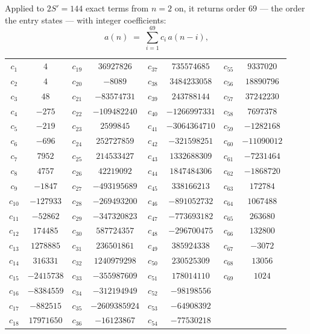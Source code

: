 \documentclass[11pt,a4paper]{article}
\theoremstyle{plain}
\theoremstyle{definition}
\begin{document}
Applied to $2S'=144$ exact terms from $n=2$ on, it returns order $69$ --- the
order the entry states --- with integer coefficients:
\[
a(n)\;=\;\sum_{i=1}^{69}c_i\,a(n-i),
\]
\begin{center}\small
\begin{tabular}{cccccccc}
$c_{1}$ & $4$ & $c_{19}$ & $36927826$ & $c_{37}$ & $735574685$ & $c_{55}$ & $9337020$ \\
$c_{2}$ & $4$ & $c_{20}$ & $-8089$ & $c_{38}$ & $3484233058$ & $c_{56}$ & $18890796$ \\
$c_{3}$ & $48$ & $c_{21}$ & $-83574731$ & $c_{39}$ & $243788144$ & $c_{57}$ & $37242230$ \\
$c_{4}$ & $-275$ & $c_{22}$ & $-109482240$ & $c_{40}$ & $-1266997331$ & $c_{58}$ & $7697378$ \\
$c_{5}$ & $-219$ & $c_{23}$ & $2599845$ & $c_{41}$ & $-3064364710$ & $c_{59}$ & $-1282168$ \\
$c_{6}$ & $-696$ & $c_{24}$ & $252727859$ & $c_{42}$ & $-321598251$ & $c_{60}$ & $-11090012$ \\
$c_{7}$ & $7952$ & $c_{25}$ & $214533427$ & $c_{43}$ & $1332688309$ & $c_{61}$ & $-7231464$ \\
$c_{8}$ & $4757$ & $c_{26}$ & $42219092$ & $c_{44}$ & $1847484306$ & $c_{62}$ & $-1868720$ \\
$c_{9}$ & $-1847$ & $c_{27}$ & $-493195689$ & $c_{45}$ & $338166213$ & $c_{63}$ & $172784$ \\
$c_{10}$ & $-127933$ & $c_{28}$ & $-269493200$ & $c_{46}$ & $-891052732$ & $c_{64}$ & $1067488$ \\
$c_{11}$ & $-52862$ & $c_{29}$ & $-347320823$ & $c_{47}$ & $-773693182$ & $c_{65}$ & $263680$ \\
$c_{12}$ & $174485$ & $c_{30}$ & $587724357$ & $c_{48}$ & $-296700475$ & $c_{66}$ & $132800$ \\
$c_{13}$ & $1278885$ & $c_{31}$ & $236501861$ & $c_{49}$ & $385924338$ & $c_{67}$ & $-3072$ \\
$c_{14}$ & $316331$ & $c_{32}$ & $1240979298$ & $c_{50}$ & $230525309$ & $c_{68}$ & $13056$ \\
$c_{15}$ & $-2415738$ & $c_{33}$ & $-355987609$ & $c_{51}$ & $178014110$ & $c_{69}$ & $1024$ \\
$c_{16}$ & $-8384559$ & $c_{34}$ & $-312194949$ & $c_{52}$ & $-98198556$ &  &  \\
$c_{17}$ & $-882515$ & $c_{35}$ & $-2609385924$ & $c_{53}$ & $-64908392$ &  &  \\
$c_{18}$ & $17971650$ & $c_{36}$ & $-16123867$ & $c_{54}$ & $-77530218$ &  &  \\
\end{tabular}
\end{center}
\end{document}
